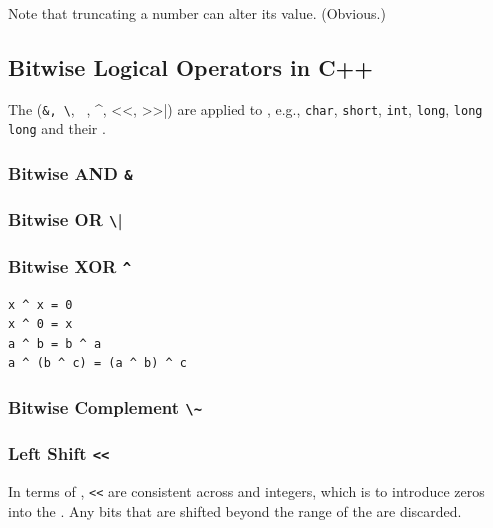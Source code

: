 Note that truncating a number can alter its value. (Obvious.)

\subsection{Bitwise Logical Operators in C++}
The {\color{blue}{bitwise logical operators}} ({\colorbox{CodeBackground}{\lstinline|&, \|, ~, ^, <<, >>|}}) are applied to {\color{blue}{integral types}},  e.g., {\colorbox{CodeBackground}{\lstinline|char|}}, {\colorbox{CodeBackground}{\lstinline|short|}}, {\colorbox{CodeBackground}{\lstinline|int|}}, {\colorbox{CodeBackground}{\lstinline|long|}}, {\colorbox{CodeBackground}{\lstinline|long long|}} and their {\color{blue}{unsigned counterparts}}.
 
\subsubsection{Bitwise AND {\colorbox{CodeBackground}{\lstinline|&|}}}

\subsubsection{Bitwise OR {\colorbox{CodeBackground}{\lstinline|\||}}}

\subsubsection{Bitwise XOR {\colorbox{CodeBackground}{\lstinline|^|}}}
\begin{lstlisting}
x ^ x = 0
x ^ 0 = x
a ^ b = b ^ a
a ^ (b ^ c) = (a ^ b) ^ c
\end{lstlisting}

\subsubsection{Bitwise Complement {\colorbox{CodeBackground}{\lstinline|\~|}}}

\subsubsection{Left Shift {\colorbox{CodeBackground}{\lstinline|<<|}}}
In terms of {\color{blue}{bit patterns}}, {\color{blue}{left shifts}} {\colorbox{CodeBackground}{\lstinline|<<|}} are consistent across {\color{blue}{signed}} and {\color{blue}{unsigned}} integers, which is to introduce zeros into the {\color{blue}{least significant bit (LSB)}}. Any bits that are shifted beyond the range of the {\color{blue}{most significant bit (MSB)}} are discarded.\\

